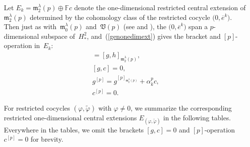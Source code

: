 \documentclass[pdftex]{sigma}
\def\phi{\varphi}
\def\m{\mathfrak m}
\def\V{\mathfrak V}
\def\F{\mathbb F}
\numberwithin{equation}{section}
\begin{document}
Let $E_k=\m_2^\lambda(p)\oplus \F c$ denote the one-dimensional restricted central extension of $\m_2^\lambda(p)$ determined by the cohomology class of the restricted cocycle $\big(0,\overline e^k\big)$. Then just as with~$\m_0^\lambda(p)$ and~$\V(p)$ (see \cite[Theorem~5.1]{EvFi2019} and \cite[Theorem~3.1]{EvFiPe2016}), the
$\big(0,\overline e^k\big)$ span a $p$-dimensional subspace of~$H^2_*$, and~(\ref{genonedimext}) gives the bracket and $[p]$-operation in~$E_k$:
\begin{gather*}
 [g,h] =[g,h]_{\m_2^\lambda(p)},\\
 [g, c] = 0,\\
 g^{[p]} = g^{[p]_{\m_2^\lambda(p)}}+ \alpha_k^p c,\\
 c^{[p]} = 0.
\end{gather*}

For restricted cocycles $(\phi,\tilde\phi)$ with $\phi\ne 0$, we summarize the corresponding restricted one-dimensional central extensions $E_{(\phi,\tilde\phi)}$ in the following tables. Everywhere in the tables, we omit the brackets $[g,c]=0$ and $[p]$-operation $c^{[p]}=0$ for brevity.
\end{document}

